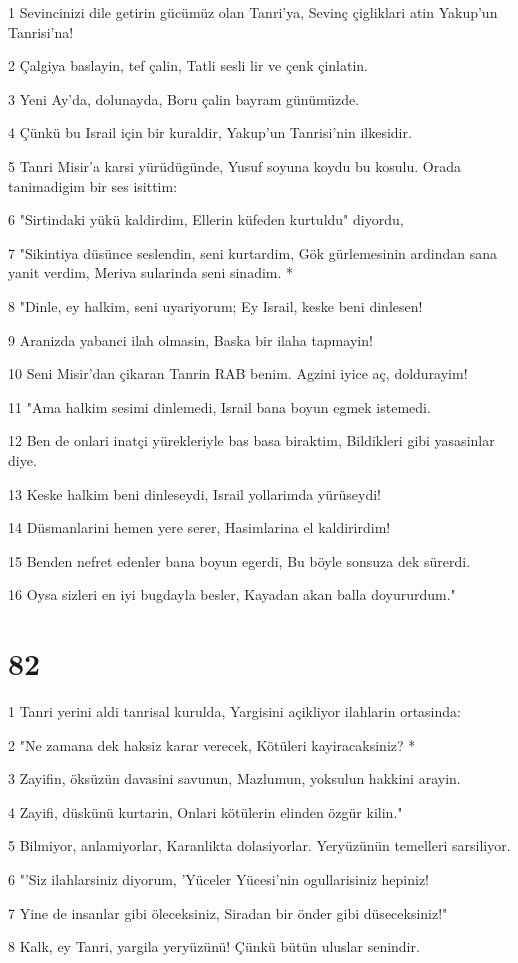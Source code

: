 \par 1 Sevincinizi dile getirin gücümüz olan Tanri'ya, Sevinç çigliklari atin Yakup'un Tanrisi'na!
\par 2 Çalgiya baslayin, tef çalin, Tatli sesli lir ve çenk çinlatin.
\par 3 Yeni Ay'da, dolunayda, Boru çalin bayram günümüzde.
\par 4 Çünkü bu Israil için bir kuraldir, Yakup'un Tanrisi'nin ilkesidir.
\par 5 Tanri Misir'a karsi yürüdügünde, Yusuf soyuna koydu bu kosulu. Orada tanimadigim bir ses isittim:
\par 6 "Sirtindaki yükü kaldirdim, Ellerin küfeden kurtuldu" diyordu,
\par 7 "Sikintiya düsünce seslendin, seni kurtardim, Gök gürlemesinin ardindan sana yanit verdim, Meriva sularinda seni sinadim. *
\par 8 "Dinle, ey halkim, seni uyariyorum; Ey Israil, keske beni dinlesen!
\par 9 Aranizda yabanci ilah olmasin, Baska bir ilaha tapmayin!
\par 10 Seni Misir'dan çikaran Tanrin RAB benim. Agzini iyice aç, doldurayim!
\par 11 "Ama halkim sesimi dinlemedi, Israil bana boyun egmek istemedi.
\par 12 Ben de onlari inatçi yürekleriyle bas basa biraktim, Bildikleri gibi yasasinlar diye.
\par 13 Keske halkim beni dinleseydi, Israil yollarimda yürüseydi!
\par 14 Düsmanlarini hemen yere serer, Hasimlarina el kaldirirdim!
\par 15 Benden nefret edenler bana boyun egerdi, Bu böyle sonsuza dek sürerdi.
\par 16 Oysa sizleri en iyi bugdayla besler, Kayadan akan balla doyururdum."

\chapter{82}

\par 1 Tanri yerini aldi tanrisal kurulda, Yargisini açikliyor ilahlarin ortasinda:
\par 2 "Ne zamana dek haksiz karar verecek, Kötüleri kayiracaksiniz? *
\par 3 Zayifin, öksüzün davasini savunun, Mazlumun, yoksulun hakkini arayin.
\par 4 Zayifi, düskünü kurtarin, Onlari kötülerin elinden özgür kilin."
\par 5 Bilmiyor, anlamiyorlar, Karanlikta dolasiyorlar. Yeryüzünün temelleri sarsiliyor.
\par 6 "'Siz ilahlarsiniz diyorum, 'Yüceler Yücesi'nin ogullarisiniz hepiniz!
\par 7 Yine de insanlar gibi öleceksiniz, Siradan bir önder gibi düseceksiniz!"
\par 8 Kalk, ey Tanri, yargila yeryüzünü! Çünkü bütün uluslar senindir.

